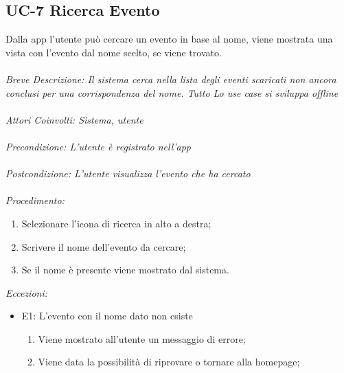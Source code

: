 \subsection{UC-7 Ricerca Evento}
Dalla app l'utente può cercare un evento in base al nome, viene mostrata una vista con l'evento dal nome scelto, se viene trovato.
\\
\\
\textit{Breve Descrizione: Il sistema cerca nella lista degli eventi scaricati non ancora conclusi per una corrispondenza del nome. Tutto Lo use case si sviluppa offline} 
\\
\\
\textit{Attori Coinvolti: Sistema, utente}
\\
\\
\textit{Precondizione: L'utente è registrato nell'app}
\\
\\
\textit{Postcondizione: L'utente visualizza l'evento che ha cercato}
\\
\\
\textit{Procedimento:}
\begin{enumerate}
	\item Selezionare l'icona di ricerca in alto a destra;
	\item Scrivere il nome dell'evento da cercare;
	\item Se il nome è presente viene mostrato dal sistema.
\end{enumerate}


\textit{Eccezioni:}
\begin{itemize}
	\item E1: L'evento con il nome dato non esiste
	\begin{enumerate}
		\item Viene mostrato all'utente un messaggio di errore;
		\item Viene data la possibilità di riprovare o tornare alla homepage;
	\end{enumerate}
\end{itemize}
